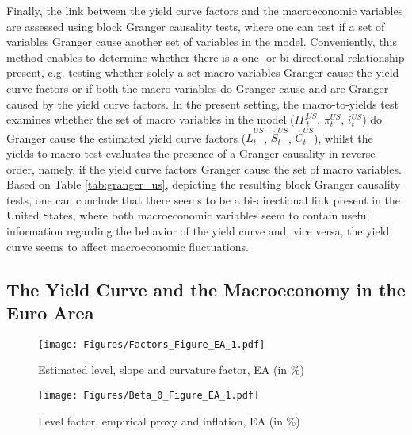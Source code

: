 Finally, the link between the yield curve factors and the macroeconomic variables are assessed using block Granger causality tests, where one can test if a set of variables Granger cause another set of variables in the model. 
Conveniently, this method enables to determine whether there is a one- or bi-directional relationship present, e.g. testing whether solely a set macro variables Granger cause the yield curve factors or if both the macro variables do Granger cause and are Granger caused by the yield curve factors. 
In the present setting, the macro-to-yields test examines whether the set of macro variables in the model ($IP^{US}_{t}$, $\pi^{US}_{t}$, $i^{US}_{t}$) do Granger cause the estimated yield curve factors ($\hat{L}^{US}_{t}$, $\hat{S}^{US}_{t}$, $\hat{C}^{US}_{t}$), whilst the yields-to-macro test evaluates the presence of a Granger causality in reverse order, namely, if the yield curve factors Granger cause the set of macro variables. 
Based on Table \ref{tab:granger_us}, depicting the resulting block Granger causality tests, one can conclude that there seems to be a bi-directional link present in the United States, where both macroeconomic variables seem to contain useful information regarding the behavior of the yield curve and, vice versa, the yield curve seems to affect macroeconomic fluctuations. 



\subsection{The Yield Curve and the Macroeconomy in the Euro Area}
\label{sec:analysis_ea}

\begin{figure}[!t]
    \centering
    \texttt{[image: Figures/Factors\_Figure\_EA\_1.pdf]}
    \caption{Estimated level, slope and curvature factor, EA (in \%)}
    \label{fig:factors_ea}
\end{figure}

\begin{figure}[!t]
    \centering
    \texttt{[image: Figures/Beta\_0\_Figure\_EA\_1.pdf]}
    \caption{Level factor, empirical proxy and inflation, EA (in \%)}
    \label{fig:level_factor_ea}
\end{figure}


